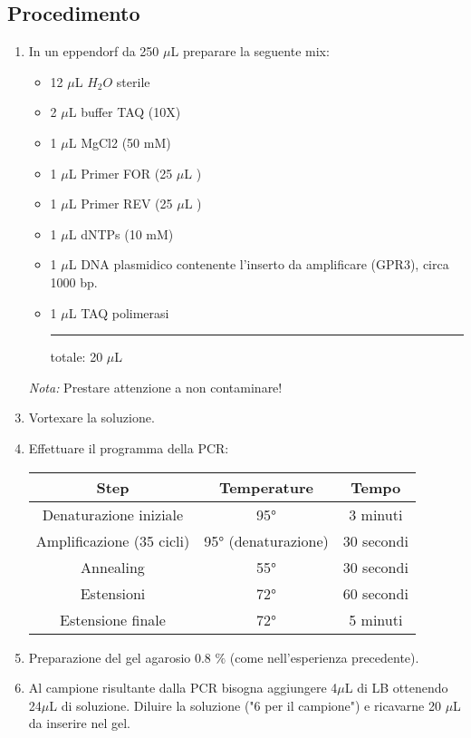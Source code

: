 \documentclass{extarticle}
\begin{document}
\subsection*{Procedimento}
\begin{enumerate}
    \item In un eppendorf da 250 $\mu$L preparare la seguente mix:
    \begin{itemize}
        \item 12 $\mu$L  $H_{2}O$ sterile
        \item 2 $\mu$L buffer TAQ (10X)
        \item 1 $\mu$L MgCl2 (50 mM)
        \item 1 $\mu$L Primer FOR (25 $\mu$L )
        \item 1 $\mu$L Primer REV (25 $\mu$L )
        \item 1 $\mu$L dNTPs (10 mM)
        \item 1 $\mu$L DNA plasmidico contenente l'inserto da amplificare (GPR3), circa 1000 bp.
        \item 1 $\mu$L TAQ polimerasi
        \item[] \rule{50pt}{0.4pt}
        \item[] totale: 20 $\mu$L 
    \end{itemize}
    \item[\textit{Nota:}]Prestare attenzione a non contaminare!
    \item Vortexare la soluzione. 
    \item Effettuare il programma della PCR:
        \begin{center}
            \begin{tabular}{ccc}
            \toprule
            \textbf{Step} & \textbf{Temperature} & \textbf{Tempo}\\
            \midrule
            Denaturazione iniziale & 95° & 3 minuti \\
            Amplificazione (35 cicli) & 95° (denaturazione) & 30 secondi\\
            Annealing & 55°  & 30 secondi \\
            Estensioni & 72° & 60 secondi \\
            Estensione finale & 72° & 5 minuti \\
            \bottomrule
            \end{tabular}
        \end{center}
    \item Preparazione del gel agarosio 0.8 $\%$ (come nell'esperienza precedente).
    \item Al campione risultante dalla PCR bisogna aggiungere 4$\mu$L di LB ottenendo 24$\mu$L di soluzione. Diluire la soluzione ("6 per il campione") e ricavarne 20 $\mu$L da inserire nel gel.
\end{enumerate}
\end{document}
